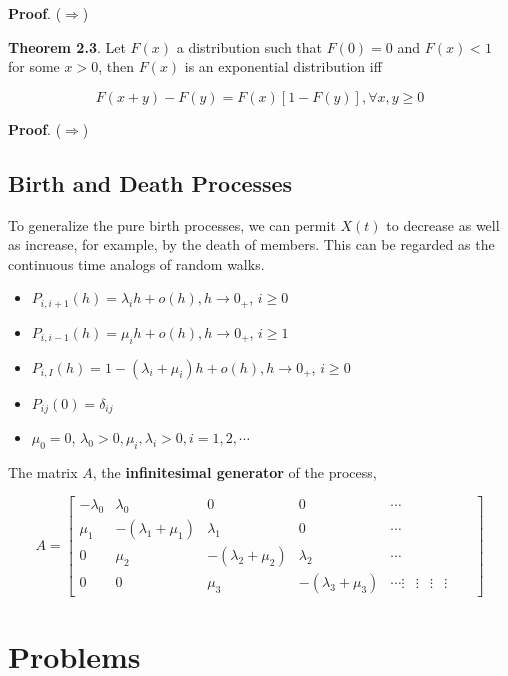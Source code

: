 \documentclass[12pt]{article}
\theoremstyle{nonumberbreak}
\begin{document}
\textbf{Proof}. ($\Rightarrow$) 




\begin{theorem}
\textbf{Theorem 2.3}. Let $F(x)$ a distribution such that $F(0) = 0$ and $F(x) < 1$ for some $x >0 $, then $F(x)$ is an exponential distribution iff

$$
F(x+y) - F(y) = F(x)[1-F(y)], \forall x,y \ge 0
$$
\end{theorem}

\textbf{Proof}. ($\Rightarrow$) 




\subsection{Birth and Death Processes}

To generalize the pure birth processes, we can permit $X(t)$ to decrease as well as increase, for example, by the death of members. This can be regarded as the continuous time analogs of random walks. 


\begin{itemize}
	\item $P_{i, i+1}(h) = \lambda_i h + o(h), h \to 0_+$, $i \ge 0$
	\item $P_{i, i-1}(h) = \mu_i h + o(h), h \to 0_+$, $i \ge 1$
	\item $P_{i,I} (h) = 1 -(\lambda_i + \mu_i) h + o(h), h \to 0_+$, $i \ge 0$
	\item $P_{ij} (0) = \delta_{ij}$
	\item $\mu_0 = 0$, $\lambda_0 > 0, \mu_i, \lambda_i > 0, i=1,2,\cdots$
\end{itemize}

The matrix $A$, the \textbf{infinitesimal generator} of the process,

$$
A = \begin{bmatrix}
-\lambda_0 & \lambda_0 & 0 & 0 & \cdots \\
\mu_1 & -(\lambda_1 + \mu_1)  & \lambda_1 & 0 & \cdots \\
0 & \mu_2 & -(\lambda_2 + \mu_2) & \lambda_2 & \cdots \\
0 & 0 & \mu_3 & -(\lambda_3 + \mu_3) & \cdots
\vdots & \vdots &  \vdots &  \vdots &   & 
\end{bmatrix}
$$


\section{Problems}
\end{document}
